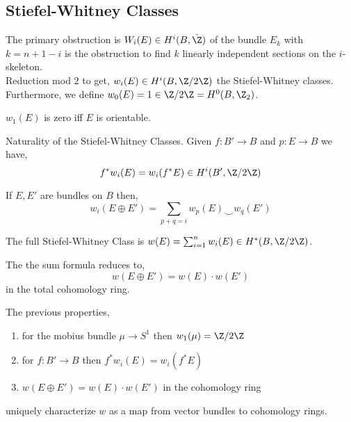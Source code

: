 \documentclass[12pt]{extarticle}
\begin{document}
\subsection{Stiefel-Whitney Classes}

\newcommand{\E}{\mathcal{E}}

The primary obstruction is $W_i(E) \in H^i(B, \tilde{\Z})$ of the bundle $E_k$ with $k = n + 1 -i$ is the obstruction to find $k$ linearly independent sections on the $i$-skeleton. 
\bigskip\\
Reduction mod $2$ to get, $w_i(E) \in H^i(B, \Z/2\Z)$ the Stiefel-Whitney classes. Furthermore, we define $w_0(E) = 1 \in \Z/2\Z = H^0(B, \Z_2)$. 

\begin{proposition}
$w_1(E)$ is zero iff $E$ is orientable. 
\end{proposition}

\begin{lemma}
Naturality of the Stiefel-Whitney Classes. Given $f : B' \to B$ and $p : E \to B$ we have,
\[ f^* w_i(E) = w_i(f^*E) \in H^i(B', \Z / 2 \Z) \] 
\end{lemma}

\begin{theorem}
If $E, E'$ are bundles on $B$ then,
\[ w_i(E \oplus E') = \sum_{p + q = i} w_p(E) \smile w_q(E') \]
\end{theorem}

\begin{defn}
The full Stiefel-Whitney Class is $w(E) = \sum_{i = 1}^n w_i(E) \in H^*(B, \Z/2\Z)$.
\end{defn}

\begin{rmk}
The the sum formula reduces to,
\[ w(E \oplus E') = w(E) \cdot w(E') \]
in the total cohomology ring. 
\end{rmk}

\begin{theorem}
The previous properties,
\begin{enumerate}
\item for the mobius bundle $\mu \to S^1$ then $w_1(\mu) = \Z / 2 \Z$
\item for $f : B' \to B$ then $f^* w_i(E) = w_i(f^* E)$
\item $w(E \oplus E') = w(E) \cdot w(E')$ in the cohomology ring
\end{enumerate}
uniquely characterize $w$ as a map from vector bundles to cohomology rings. 
\end{theorem}
\end{document}
